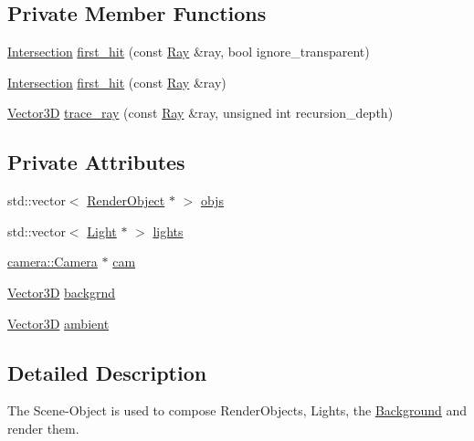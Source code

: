 \subsection*{Private Member Functions}
\begin{DoxyCompactItemize}
\item 
\mbox{\hyperlink{classIntersection}{Intersection}} \mbox{\hyperlink{classScene_a671595e773bd4336c0fa67186aff609d}{first\+\_\+hit}} (const \mbox{\hyperlink{classRay}{Ray}} \&ray, bool ignore\+\_\+transparent)
\item 
\mbox{\hyperlink{classIntersection}{Intersection}} \mbox{\hyperlink{classScene_a726867ff812fd8776fe0b4319538e9e7}{first\+\_\+hit}} (const \mbox{\hyperlink{classRay}{Ray}} \&ray)
\item 
\mbox{\hyperlink{classVector3D}{Vector3D}} \mbox{\hyperlink{classScene_a9ccd15bf4c359c1585fe87d85d424d55}{trace\+\_\+ray}} (const \mbox{\hyperlink{classRay}{Ray}} \&ray, unsigned int recursion\+\_\+depth)
\end{DoxyCompactItemize}
\subsection*{Private Attributes}
\begin{DoxyCompactItemize}
\item 
std\+::vector$<$ \mbox{\hyperlink{classRenderObject}{Render\+Object}} $\ast$ $>$ \mbox{\hyperlink{classScene_a37361b6054643b62fcb8e6b7c828e5dd}{objs}}
\item 
std\+::vector$<$ \mbox{\hyperlink{classLight}{Light}} $\ast$ $>$ \mbox{\hyperlink{classScene_a4ecc3182a80435e1c4dfbe1b20e559bd}{lights}}
\item 
\mbox{\hyperlink{classcamera_1_1Camera}{camera\+::\+Camera}} $\ast$ \mbox{\hyperlink{classScene_a3e5448bc1b1150aa67049914b7800b63}{cam}}
\item 
\mbox{\hyperlink{classVector3D}{Vector3D}} \mbox{\hyperlink{classScene_ac745fba97d639cebcf0e8fbf59967da2}{backgrnd}}
\item 
\mbox{\hyperlink{classVector3D}{Vector3D}} \mbox{\hyperlink{classScene_a284ce5b2aeb47c64d6712d9748229c47}{ambient}}
\end{DoxyCompactItemize}


\subsection{Detailed Description}
The Scene-\/\+Object is used to compose Render\+Objects, Lights, the \mbox{\hyperlink{classBackground}{Background}} and render them. 

